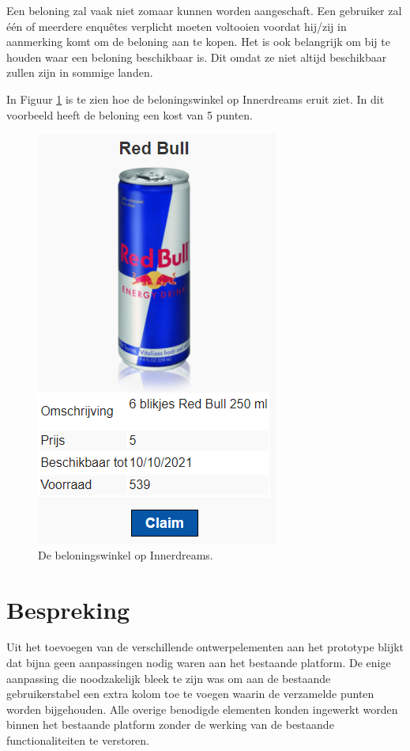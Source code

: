 Een beloning zal vaak niet zomaar kunnen worden aangeschaft. Een gebruiker zal één of meerdere enquêtes verplicht moeten voltooien voordat hij/zij in aanmerking komt om de beloning aan te kopen. Het is ook belangrijk om bij te houden waar een beloning beschikbaar is. Dit omdat ze niet altijd beschikbaar zullen zijn in sommige landen.

In Figuur \ref{fig:rewardshop} is te zien hoe de beloningswinkel op Innerdreams eruit ziet. In dit voorbeeld heeft de beloning een kost van 5 punten.

\begin{figure}
    \includegraphics[scale=0.95]{RewardShop.png}
    \centering
    \caption{De beloningswinkel op Innerdreams.}
    \label{fig:rewardshop}
\end{figure}

\section{Bespreking}

Uit het toevoegen van de verschillende ontwerpelementen aan het prototype blijkt dat bijna geen aanpassingen nodig waren aan het bestaande platform. De enige aanpassing die noodzakelijk bleek te zijn was om aan de bestaande gebruikerstabel een extra kolom toe te voegen waarin de verzamelde punten worden bijgehouden. Alle overige benodigde elementen konden ingewerkt worden binnen het bestaande platform zonder de werking van de bestaande functionaliteiten te verstoren.